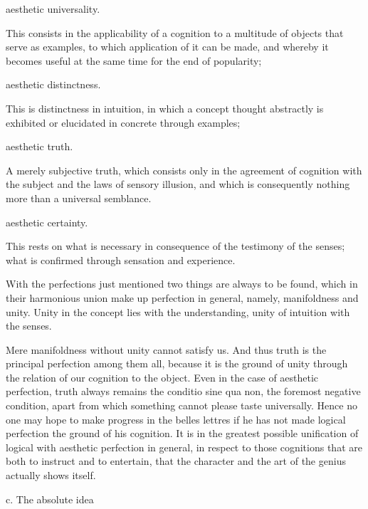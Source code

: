 aesthetic universality.

    This consists in the applicability of a cognition to
    a multitude of objects that serve as examples,
    to which application of it can be made,
    and whereby it becomes useful at the same time
    for the end of popularity;

aesthetic distinctness.

    This is distinctness in intuition,
    in which a concept thought abstractly
    is exhibited or elucidated
    in concrete through examples;

aesthetic truth.

    A merely subjective truth,
    which consists only in
    the agreement of cognition with the subject
    and the laws of sensory illusion,
    and which is consequently nothing more
    than a universal semblance.

aesthetic certainty.

    This rests on what is necessary
    in consequence of the testimony of the senses;
    what is confirmed through sensation and experience.

With the perfections just mentioned
two things are always to be found,
which in their harmonious union
make up perfection in general,
namely, manifoldness and unity.
Unity in the concept lies with the understanding,
unity of intuition with the senses.

Mere manifoldness without unity cannot satisfy us.
And thus truth is the principal perfection among them all,
because it is the ground of unity through
the relation of our cognition to the object.
Even in the case of aesthetic perfection,
truth always remains the conditio sine qua non,
the foremost negative condition,
apart from which something cannot please taste universally.
Hence no one may hope to make progress in the belles lettres
if he has not made logical perfection the ground of his cognition.
It is in the greatest possible unification of
logical with aesthetic perfection in general,
in respect to those cognitions that are both
to instruct and to entertain,
that the character and the art of
the genius actually shows itself.

c. The absolute idea
